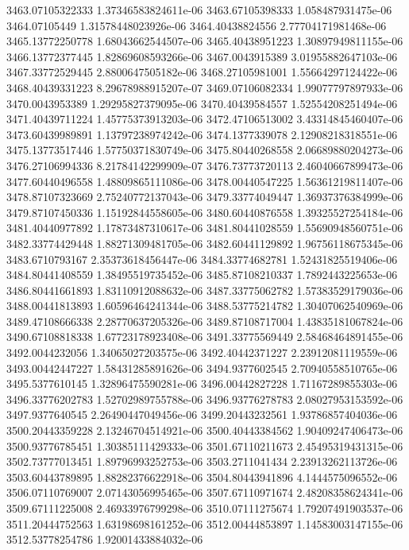{3463.07105322333 1.37346583824611e-06
3463.67105398333 1.058487931475e-06
3464.07105449 1.31578448023926e-06
3464.40438824556 2.77704171981468e-06
3465.13772250778 1.68043662544507e-06
3465.40438951223 1.30897949811155e-06
3466.13772377445 1.82869608593266e-06
3467.0043915389 3.01955882647103e-06
3467.33772529445 2.8800647505182e-06
3468.27105981001 1.55664297124422e-06
3468.40439331223 8.29678988915207e-07
3469.07106082334 1.99077797897933e-06
3470.0043953389 1.29295827379095e-06
3470.40439584557 1.52554208251494e-06
3471.40439711224 1.45775373913203e-06
3472.47106513002 3.43314845460407e-06
3473.60439989891 1.13797238974242e-06
3474.1377339078 2.12908218318551e-06
3475.13773517446 1.57750371830749e-06
3475.80440268558 2.06689880204273e-06
3476.27106994336 8.21784142299909e-07
3476.73773720113 2.46040667899473e-06
3477.60440496558 1.48809865111086e-06
3478.00440547225 1.56361219811407e-06
3478.87107323669 2.75240772137043e-06
3479.33774049447 1.36937376384999e-06
3479.87107450336 1.15192844558605e-06
3480.60440876558 1.39325527254184e-06
3481.40440977892 1.17873487310617e-06
3481.80441028559 1.55690948560751e-06
3482.33774429448 1.88271309481705e-06
3482.60441129892 1.96756118675345e-06
3483.6710793167 2.35373618456447e-06
3484.33774682781 1.52431825519406e-06
3484.80441408559 1.38495519735452e-06
3485.87108210337 1.7892443225653e-06
3486.80441661893 1.83110912088632e-06
3487.33775062782 1.57383529179036e-06
3488.00441813893 1.60596464241344e-06
3488.53775214782 1.30407062540969e-06
3489.47108666338 2.28770637205326e-06
3489.87108717004 1.43835181067824e-06
3490.67108818338 1.67723178923408e-06
3491.33775569449 2.58468464891455e-06
3492.0044232056 1.34065027203575e-06
3492.40442371227 2.23912081119559e-06
3493.00442447227 1.58431285891626e-06
3494.9377602545 2.70940558510765e-06
3495.5377610145 1.32896475590281e-06
3496.00442827228 1.71167289855303e-06
3496.33776202783 1.52702989755788e-06
3496.93776278783 2.08027953153592e-06
3497.9377640545 2.26490447049456e-06
3499.20443232561 1.93786857404036e-06
3500.20443359228 2.13246704514921e-06
3500.40443384562 1.90409247406473e-06
3500.93776785451 1.30385111429333e-06
3501.67110211673 2.45495319431315e-06
3502.73777013451 1.89796993252753e-06
3503.2711041434 2.23913262113726e-06
3503.60443789895 1.88282376622918e-06
3504.80443941896 4.1444575096552e-06
3506.07110769007 2.07143056995465e-06
3507.67110971674 2.48208358624341e-06
3509.67111225008 2.46933976799298e-06
3510.07111275674 1.79207491903537e-06
3511.20444752563 1.63198698161252e-06
3512.00444853897 1.14583003147155e-06
3512.53778254786 1.92001433884032e-06
}
